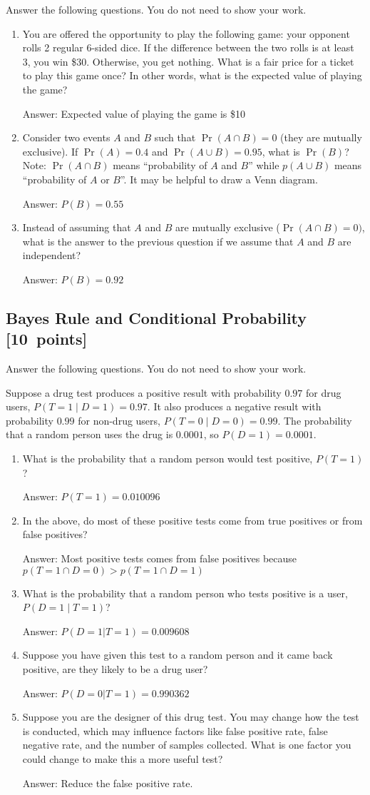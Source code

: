\documentclass{article}
\newcommand{\blu}[1]{{\textcolor{blu}{#1}}}
\newcommand{\gre}[1]{\textcolor{gre}{#1}}
\newcommand\ans[1]{\par\gre{Answer: #1}}
\let\ask\blu
\newcommand\pts[1]{\textcolor{pointscolour}{[#1~points]}}
\begin{document}
  \ask{Answer the following questions.} You do not need to show your work.

  \begin{enumerate}
  \item You are offered the opportunity to play the following game: your opponent rolls 2 regular 6-sided dice. If the difference between the two rolls is at least 3, you win \$30. Otherwise, you get nothing. What is a fair price for a ticket to play this game once? In other words, what is the expected value of playing the game?
  \ans{Expected value of playing the game is \$10}
  \item Consider two events $A$ and $B$ such that $\Pr(A \cap B)=0$ (they are mutually exclusive). If $\Pr(A) = 0.4$ and $\Pr(A \cup B) = 0.95$, what is $\Pr(B)$? Note: $\Pr(A \cap B)$ means
  ``probability of $A$ and $B$'' while $p(A \cup B)$ means ``probability of $A$ or $B$''. It may be helpful to draw a Venn diagram.
  \ans{$P(B) = 0.55$}
  \item Instead of assuming that $A$ and $B$ are mutually exclusive ($\Pr(A \cap B) = 0)$, what is the answer to the previous question if we assume that $A$ and $B$ are independent?
  \ans{$P(B) = 0.92$}

  \end{enumerate}
  \newpage
  \subsection{Bayes Rule and Conditional Probability \pts{10}}

  \ask{Answer the following questions.} You do not need to show your work.

  Suppose a drug test produces a positive result with probability $0.97$ for drug users, $P(T=1 \mid D=1)=0.97$. It also produces a negative result with probability $0.99$ for non-drug users, $P(T=0 \mid D=0)=0.99$. The probability that a random person uses the drug is $0.0001$, so $P(D=1)=0.0001$.

  \begin{enumerate}
  \item What is the probability that a random person would test positive, $P(T=1)$?
  \ans{$P(T=1) = 0.010096$}
  \item In the above, do most of these positive tests come from true positives or from false positives?
  \ans{Most positive tests comes from false positives because $p(T=1 \cap D=0) > p(T=1 \cap D=1)$}
  \item What is the probability that a random person who tests positive is a user, $P(D=1 \mid T=1)$?
  \ans{$P(D=1|T=1) = 0.009608$}
  \item Suppose you have given this test to a random person and it came back positive, are they likely to be a drug user?
  \ans{$P(D=0|T=1) = 0.990362$}
  \item Suppose you are the designer of this drug test. You may change how the test is conducted, which may influence factors like false positive rate, false negative rate, and the number of samples collected. What is one factor you could change to make this a more useful test?
  \ans{Reduce the false positive rate.}
  \end{enumerate}
\end{document}
